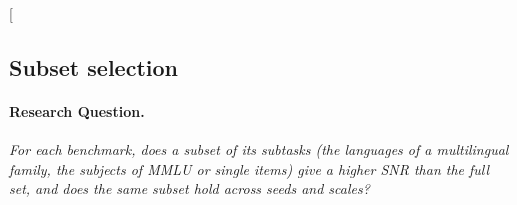 \clearpage
\twocolumn[{%
\rqparent
\subsection{Subset selection}
\label{app:rq08_subset_selection}

\noindent\begin{minipage}[t]{0.485\textwidth}
\vspace{0pt}
\paragraph{Research Question.} \emph{For each benchmark, does a subset of its subtasks (the \emph{languages} of a multilingual family, the \emph{subjects} of MMLU or single \emph{items}) give a higher SNR than the full set, and does the same subset hold across seeds and scales?}


\end{minipage}}
